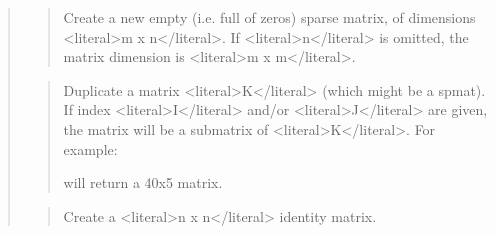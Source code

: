 \documentclass[a4paper,11pt,english]{sphinxmanual}
\begin{document}
\sphinxAtStartPar
{}
\begin{quote}

\sphinxAtStartPar
{}
\begin{quote}

\sphinxAtStartPar
Create a new empty (i.e. full of zeros) sparse matrix, of dimensions
\textless{}literal\textgreater{}m x n\textless{}/literal\textgreater{}. If \textless{}literal\textgreater{}n\textless{}/literal\textgreater{} is omitted, the matrix dimension is \textless{}literal\textgreater{}m x m\textless{}/literal\textgreater{}.
\end{quote}

\sphinxAtStartPar
{}
\begin{quote}

\sphinxAtStartPar
Duplicate a matrix \textless{}literal\textgreater{}K\textless{}/literal\textgreater{} (which might be a spmat). If index \textless{}literal\textgreater{}I\textless{}/literal\textgreater{} and/or \textless{}literal\textgreater{}J\textless{}/literal\textgreater{} are given, the matrix will
be a submatrix of \textless{}literal\textgreater{}K\textless{}/literal\textgreater{}. For example:

\begin{sphinxVerbatim}[commandchars=\\\{\}]
     \PYG{p}{[}    \PYG{p}{]}
\end{sphinxVerbatim}

\sphinxAtStartPar
will return a 40x5 matrix.
\end{quote}

\sphinxAtStartPar
{}
\begin{quote}

\sphinxAtStartPar
Create a \textless{}literal\textgreater{}n x n\textless{}/literal\textgreater{} identity matrix.
\end{quote}


\end{quote}
\end{document}
